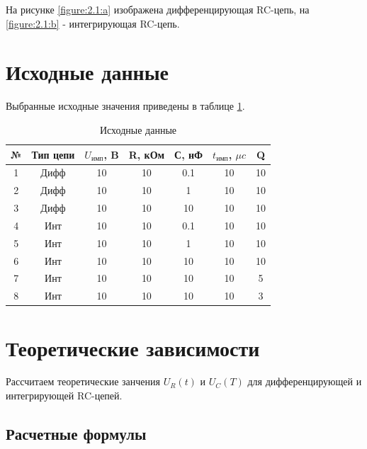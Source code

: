 На рисунке \ref{figure:2.1:a} изображена дифференцирующая RC-цепь, на \ref{figure:2.1:b} - интегрирующая RC-цепь.


\section{Исходные данные}

Выбранные исходные значения приведены в таблице \ref{tab:3:1}.

\begin{table}[H]
	\begin{center}
	\caption{Исходные данные}
	\def\arraystretch{1.2}
		\begin{tabular}{|c|c|c|c|c|c|c|}
			\hline 
			№ & Тип цепи & $U_\text{имп}$, B & R, кОм & С, нФ & $t_\text{имп}$, $\mu c$ & Q\\ 
			\hline 
			1 & Дифф & 10 & 10 & 0.1 & 10 & 10\\ 
			\hline 
			2 & Дифф & 10 & 10 & 1 & 10 & 10\\ 
			\hline 
			3 & Дифф & 10 & 10 & 10 & 10 & 10\\ 
			\hline 
			4 & Инт & 10 & 10 & 0.1 & 10 & 10\\ 
			\hline 
			5 & Инт & 10 & 10 & 1 & 10 & 10\\ 
			\hline 
			6 & Инт & 10 & 10 & 10 & 10 & 10\\
			\hline 
			7 & Инт & 10 & 10 & 10 & 10 & 5\\ 
			\hline 
			8 & Инт & 10 & 10 & 10 & 10 & 3\\ 
			\hline
		\end{tabular}
		\label{tab:3:1}
	\end{center}
\end{table}

\section{Теоретические зависимости}

Рассчитаем теоретические занчения $U_R(t)$ и $U_C(T)$ для дифференцирующей и интегрирующей RC-цепей.

\subsection{Расчетные формулы}

